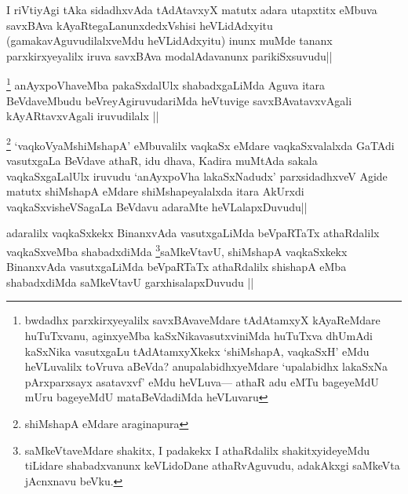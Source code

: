 \begin{artha}
I riVtiyAgi tAka sidadhxvAda tAdAtavxyX matutx adara utapxtitx eMbuva savxBAva kAyaRtegaLanunxdedxVshisi heVLidAdxyitu (gamakavAguvudilalxveMdu heVLidAdxyitu) inunx muMde tananx parxkirxyeyalilx iruva savxBAva modalAdavanunx parikiSxsuvudu||
\end{artha}


\begin{artha}
\footnote[1]{bwdadhx parxkirxyeyalilx savxBAvaveMdare tAdAtamxyX kAyaReMdare huTuTxvanu, aginxyeMba kaSxNikavasutxviniMda huTuTxva dhUmAdi kaSxNika vasutxgaLu tAdAtamxyXkekx `shiMshapA, vaqkaSxH' eMdu heVLuvalilx toVruva aBeVda? anupalabidhxyeMdare `upalabidhx lakaSxNa pArxparxsayx asatavxvf' eMdu heVLuva--- athaR adu eMTu bageyeMdU mUru bageyeMdU mataBeVdadiMda heVLuvaru}
anAyxpoVhaveMba pakaSxdalUlx shabadxgaLiMda Aguva itara BeVdaveMbudu beVreyAgiruvudariMda heVtuvige savxBAvatavxvAgali kAyARtavxvAgali iruvudilalx ||
\end{artha}


\begin{artha}
\footnote[2]{shiMshapA eMdare araginapura}
`vaqkoV\s yaMshiMshapA' eMbuvalilx vaqkaSx eMdare vaqkaSxvalalxda GaTAdi vasutxgaLa BeVdave athaR, idu dhava, Kadira muMtAda sakala vaqkaSxgaLalUlx iruvudu `anAyxpoVha lakaSxNadudx' parxsidadhxveV Agide matutx shiMshapA eMdare shiMshapeyalalxda itara AkUrxdi vaqkaSxvisheVSagaLa BeVdavu adaraMte heVLalapxDuvudu||
\end{artha}


\begin{artha}
adaralilx vaqkaSxkekx BinanxvAda vasutxgaLiMda beVpaRTaTx athaRdalilx vaqkaSxveMba shabadxdiMda \footnote[1]{saMkeVtaveMdare shakitx, I padakekx I athaRdalilx shakitxyideyeMdu tiLidare shabadxvanunx keVLidoDane athaRvAguvudu, adakAkxgi saMkeVta jAcnxnavu beVku.}saMkeVtavU, shiMshapA vaqkaSxkekx BinanxvAda vasutxgaLiMda beVpaRTaTx athaRdalilx shishapA eMba shabadxdiMda saMkeVtavU garxhisalapxDuvudu ||
\end{artha}


